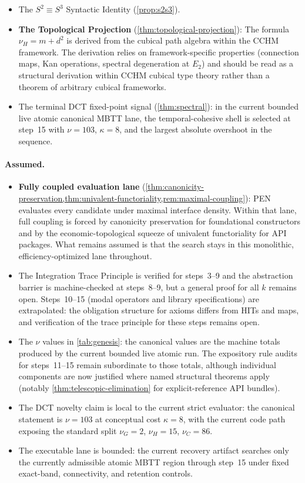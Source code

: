 \documentclass[11pt,a4paper]{article}
\theoremstyle{plain}
\theoremstyle{definition}
\theoremstyle{remark}
\begin{document}
\begin{itemize}[nosep]
    \item The $S^2 \equiv S^3$ Syntactic Identity (\cref{prop:s2s3}).
    \item \textbf{The Topological Projection} (\cref{thm:topological-projection}): The formula $\nu_H = m + d^2$ is derived from the cubical path algebra within the CCHM framework.  The derivation relies on framework-specific properties (connection maps, Kan operations, spectral degeneration at $E_2$) and should be read as a structural derivation within CCHM cubical type theory rather than a theorem of arbitrary cubical frameworks.
    \item The terminal DCT fixed-point signal (\cref{thm:spectral}): in the current bounded live atomic canonical MBTT lane, the temporal-cohesive shell is selected at step~15 with $\nu=103$, $\kappa=8$, and the largest absolute overshoot in the sequence.
\end{itemize}

\paragraph{Assumed.}
\begin{itemize}[nosep]
    \item \textbf{Fully coupled evaluation lane} (\cref{thm:canonicity-preservation,thm:univalent-functoriality,rem:maximal-coupling}): PEN evaluates every candidate under maximal interface density. Within that lane, full coupling is forced by canonicity preservation for foundational constructors and by the economic-topological squeeze of univalent functoriality for API packages. What remains assumed is that the search stays in this monolithic, efficiency-optimized lane throughout.
    \item The Integration Trace Principle is verified for steps~3--9 and the abstraction barrier is machine-checked at steps~8--9, but a general proof for all $k$ remains open.  Steps~10--15 (modal operators and library specifications) are extrapolated: the obligation structure for axioms differs from HITs and maps, and verification of the trace principle for these steps remains open.
    \item The $\nu$ values in \cref{tab:genesis}: the canonical values are the machine totals produced by the current bounded live atomic run.  The expository rule audits for steps~11--15 remain subordinate to those totals, although individual components are now justified where named structural theorems apply (notably \cref{thm:telescopic-elimination} for explicit-reference API bundles).
    \item The DCT novelty claim is local to the current strict evaluator: the canonical statement is $\nu=103$ at conceptual cost $\kappa=8$, with the current code path exposing the standard split $\nu_G=2$, $\nu_H=15$, $\nu_C=86$.
    \item The executable lane is bounded: the current recovery artifact searches only the currently admissible atomic MBTT region through step~15 under fixed exact-band, connectivity, and retention controls.
\end{itemize}
\end{document}
